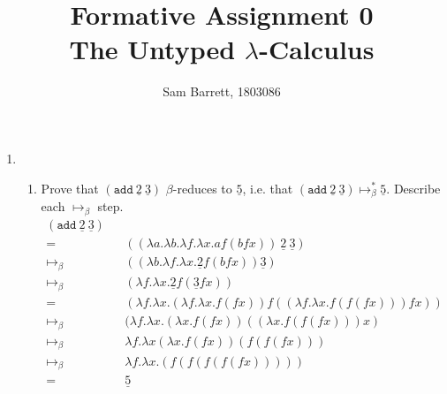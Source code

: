 \documentclass[11pt]{article}
\title{Formative Assignment 0 \\ The Untyped $\lambda$-Calculus}
\author{Sam Barrett, 1803086}
\begin{document}
\maketitle

\begin{enumerate}

	\item
	      \begin{enumerate}
		      \item Prove that $(\texttt{add}\: \underline{2} \: \underline{3})$ $\beta$-reduces to $\underline{5}$, i.e. that $(\texttt{add}\: \underline{2} \: \underline{3}) \mapsto^*_{\beta} \underline{5}$. Describe each $\mapsto_\beta$ step.
		            \begin{align*}
			            (\texttt{add} \: \underline{2} \: \underline{3}) &  &                                                                                                 \\
			            =                                                &  & ((\lambda a.\lambda b. \lambda f. \lambda x. a f ( b f x)) \: \underline{2} \: \underline{3}) & \\
			            \mapsto_\beta                                    &  & ((\lambda b. \lambda f . \lambda x . \underline{2} f (b f x))\underline{3})                   & \\
			            \mapsto_\beta                                    &  & (\lambda f. \lambda x. \underline{2}f(\underline{3} f x))                                     & \\
			            =                                                &  & (\lambda f. \lambda x. (\lambda f.\lambda x.f(f x))f((\lambda f.\lambda x. f(f(f x)))f x))    & \\
			            \mapsto_\beta                                    &  & ( \lambda f. \lambda x. ( \lambda x. f ( f x))(( \lambda x. f(f(f x)))x)                      & \\
			            \mapsto_\beta                                    &  & \lambda f. \lambda x ( \lambda x. f (f x))(f ( f(f x)))                                       & \\
			            \mapsto_\beta                                    &  & \lambda f. \lambda x.(f (f (f(f(f x)))))                                                      & \\
			            =                                                &  & \underline{5}
		            \end{align*}



\end{enumerate}
\end{enumerate}
\end{document}
